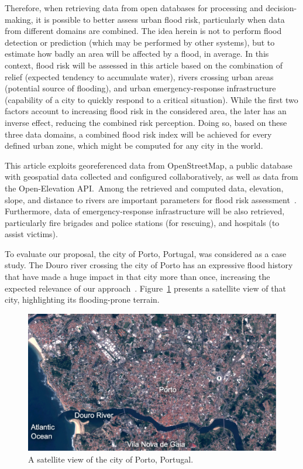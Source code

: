\begin{refsection}
Therefore, when retrieving data from open databases for processing and decision-making, it is possible to better assess urban flood risk, particularly when data from different domains are combined. The idea herein is not to perform flood detection or prediction (which may be performed by other systems), but to estimate how badly an area will be affected by a flood, in average. In this context, flood risk will be assessed in this article based on the combination of relief (expected tendency to accumulate water), rivers crossing urban areas (potential source of flooding), and urban emergency-response infrastructure (capability of a city to quickly respond to a critical situation). While the first two factors account to increasing flood risk in the considered area, the later has an inverse effect, reducing the combined risk perception. Doing so, based on these three data domains, a combined flood risk index will be achieved for every defined urban zone, which might be computed for any city in the world.

This article exploits georeferenced data from OpenStreetMap, a public database with geospatial data collected and configured collaboratively, as well as data from the Open-Elevation API.\ Among the retrieved and computed data, elevation, slope, and distance to rivers are important parameters for flood risk assessment~\cite{elevation1}. Furthermore, data of emergency-response infrastructure will be also retrieved, particularly fire brigades and police stations (for rescuing), and hospitals (to assist victims). 

To evaluate our proposal, the city of Porto, Portugal, was considered as a case study. The Douro river crossing the city of Porto has an expressive flood history that have made a huge impact in that city more than once, increasing the expected relevance of our approach~\cite{dourohistory}. Figure~\ref{fig:porto_douro} presents a satellite view of that city, highlighting its flooding-prone terrain.

\begin{figure}[ht]
  \centering
  \includegraphics[width=0.9\linewidth]{Chapters/6-Flood/figs/porto_satellite.pdf}
  \caption{A satellite view of the city of Porto, Portugal.}\label{fig:porto_douro}
\end{figure}


\end{refsection}
